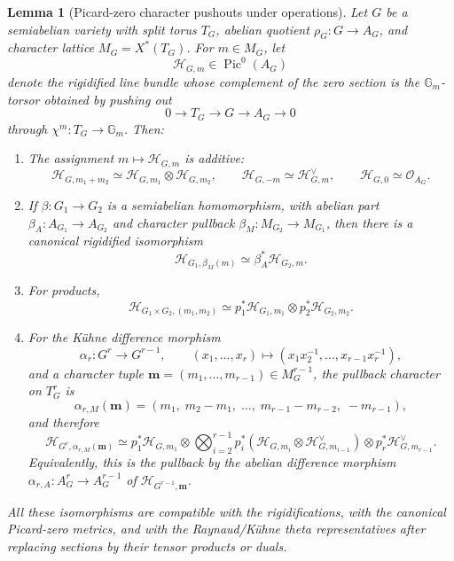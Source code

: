 \documentclass[10pt,a4paper]{amsart}
\theoremstyle{plain}
\newtheorem{lemma}[theorem]{Lemma}
\theoremstyle{plain}
\numberwithin{equation}{section}
\begin{document}
\begin{lemma}[Picard-zero character pushouts under operations]
	\label{lem:character-pushout-picard-zero-functoriality}
	Let \(G\) be a semiabelian variety with split torus \(T_G\), abelian quotient
	\(\rho_G:G\to A_G\), and character lattice \(M_G=X^*(T_G)\).  For
	\(m\in M_G\), let
	\[
	\mathcal H_{G,m}\in \operatorname{Pic}^0(A_G)
	\]
	denote the rigidified line bundle whose complement of the zero section is the
	\(\mathbb G_m\)-torsor obtained by pushing out
	\[
	0\longrightarrow T_G\longrightarrow G\longrightarrow A_G\longrightarrow0
	\]
	through \(\chi^m:T_G\to\mathbb G_m\).  Then:
	\begin{enumerate}[label=\textup{(\alph*)},leftmargin=2em]
		\item The assignment \(m\mapsto\mathcal H_{G,m}\) is additive:
		\[
		\mathcal H_{G,m_1+m_2}\simeq
		\mathcal H_{G,m_1}\otimes\mathcal H_{G,m_2},\qquad
		\mathcal H_{G,-m}\simeq\mathcal H_{G,m}^{\vee},\qquad
		\mathcal H_{G,0}\simeq\mathcal O_{A_G}.
		\]
		\item If \(\beta:G_1\to G_2\) is a semiabelian homomorphism, with abelian part
		\(\beta_A:A_{G_1}\to A_{G_2}\) and character pullback
		\(\beta_M:M_{G_2}\to M_{G_1}\), then there is a canonical rigidified
		isomorphism
		\[
		\mathcal H_{G_1,\beta_M(m)}
		\simeq
		\beta_A^*\mathcal H_{G_2,m}.
		\]
		\item For products,
		\[
		\mathcal H_{G_1\times G_2,(m_1,m_2)}
		\simeq
		p_1^*\mathcal H_{G_1,m_1}\otimes
		p_2^*\mathcal H_{G_2,m_2}.
		\]
		\item For the K\"uhne difference morphism
		\[
		\alpha_r:G^r\longrightarrow G^{r-1},\qquad
		(x_1,\ldots,x_r)\longmapsto
		(x_1x_2^{-1},\ldots,x_{r-1}x_r^{-1}),
		\]
		and a character tuple
		\(\mathbf m=(m_1,\ldots,m_{r-1})\in M_G^{r-1}\), the pullback character on
		\(T_G^r\) is
		\[
		\alpha_{r,M}(\mathbf m)
		=
		(m_1,\;m_2-m_1,\;\ldots,\;m_{r-1}-m_{r-2},\;-m_{r-1}),
		\]
		and therefore
		\[
		\mathcal H_{G^r,\alpha_{r,M}(\mathbf m)}
		\simeq
		p_1^*\mathcal H_{G,m_1}\otimes
		\bigotimes_{i=2}^{r-1}
		p_i^*(\mathcal H_{G,m_i}\otimes\mathcal H_{G,m_{i-1}}^\vee)
		\otimes
		p_r^*\mathcal H_{G,m_{r-1}}^\vee .
		\]
		Equivalently, this is the pullback by the abelian difference morphism
		\(\alpha_{r,A}:A_G^r\to A_G^{r-1}\) of
		\(\mathcal H_{G^{r-1},\mathbf m}\).
	\end{enumerate}
	All these isomorphisms are compatible with the rigidifications, with the
	canonical Picard-zero metrics, and with the Raynaud/K\"uhne theta
	representatives after replacing sections by their tensor products or duals.
\end{lemma}
\end{document}
